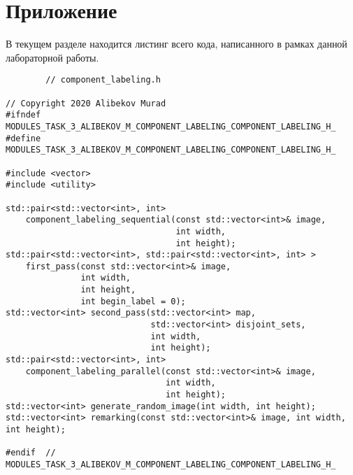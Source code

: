 \documentclass{report}
\begin{document}
	\section*{Приложение}
	\par В текущем разделе находится листинг всего кода, написанного в рамках данной лабораторной работы.
	\begin{lstlisting}
		// component_labeling.h
		
// Copyright 2020 Alibekov Murad
#ifndef MODULES_TASK_3_ALIBEKOV_M_COMPONENT_LABELING_COMPONENT_LABELING_H_
#define MODULES_TASK_3_ALIBEKOV_M_COMPONENT_LABELING_COMPONENT_LABELING_H_

#include <vector>
#include <utility>

std::pair<std::vector<int>, int> 
    component_labeling_sequential(const std::vector<int>& image,
                                  int width,
                                  int height);
std::pair<std::vector<int>, std::pair<std::vector<int>, int> >
    first_pass(const std::vector<int>& image,
               int width,
               int height, 
               int begin_label = 0);
std::vector<int> second_pass(std::vector<int> map,
                             std::vector<int> disjoint_sets,
                             int width,
                             int height);
std::pair<std::vector<int>, int>
    component_labeling_parallel(const std::vector<int>& image,
                                int width,
                                int height);
std::vector<int> generate_random_image(int width, int height);
std::vector<int> remarking(const std::vector<int>& image, int width, int height);

#endif  // MODULES_TASK_3_ALIBEKOV_M_COMPONENT_LABELING_COMPONENT_LABELING_H_
	\end{lstlisting}
\end{document}
